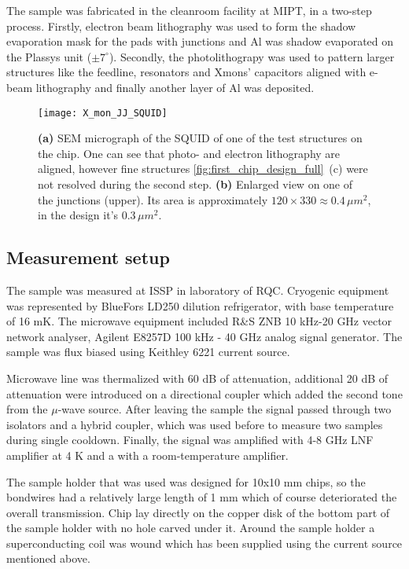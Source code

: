 \documentclass[12pt, twoside]{report}
\numberwithin{equation}{section}
\begin{document}
The sample was fabricated in the cleanroom facility at MIPT, in a two-step process. Firstly, electron beam lithography was used to form the shadow evaporation mask for the pads with junctions and Al was shadow evaporated on the Plassys unit ($\pm 7^\circ$). Secondly, the photolithograpy was used to pattern larger structures like the feedline, resonators and Xmons' capacitors aligned with e-beam lithography and finally another layer of Al was deposited.	

\begin{figure}
\centering
\texttt{[image: X\_mon\_JJ\_SQUID]}
\caption{\textbf{(a)} SEM micrograph of the SQUID of one of the test structures on the chip. One can see that photo- and electron lithography are aligned, however fine structures \autoref{fig:first_chip_design_full}~(c) were not resolved during the second step. \textbf{(b)} Enlarged view on one of the junctions (upper). Its area is approximately $120\times 330\approx 0.4\, \mu m^2$, in the design it's $0.3\,\mu m^2$.} 
\end{figure}

\subsection{Measurement setup}

The sample was measured at ISSP in laboratory of RQC. Cryogenic equipment was represented by BlueFors LD250 dilution refrigerator, with base temperature of 16 mK. The microwave equipment included R\&S ZNB 10 kHz-20 GHz vector network analyser,  Agilent E8257D 100 kHz - 40 GHz analog signal generator. The sample was flux biased using Keithley 6221 current source.

Microwave line was thermalized with 60 dB of attenuation, additional 20 dB of attenuation were introduced on a directional coupler which added the second tone from the $\mu$-wave source. After leaving the sample the signal passed through two isolators and a hybrid coupler, which was used before to measure two samples during single cooldown. Finally, the signal was amplified with 4-8 GHz LNF amplifier at 4 K and a with a room-temperature amplifier.

The sample holder that was used was designed for 10x10 mm chips, so the bondwires had a relatively large length of 1 mm which of course deteriorated the overall transmission. Chip lay directly on the copper disk of the bottom part of the sample holder with no hole carved under it. Around the sample holder a superconducting coil was wound which has been supplied using the current source mentioned above.
\end{document}
